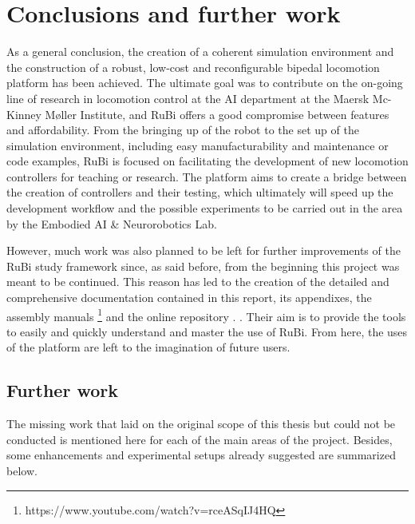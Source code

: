 \chapter{Conclusions and further work} %
\label{cha:conclusions}
As a general conclusion, the creation of a coherent simulation environment and the construction of a robust, low-cost and reconfigurable bipedal locomotion platform has been achieved.
The ultimate goal was to contribute on the on-going line of research in locomotion control at the AI department at the Maersk Mc-Kinney Møller Institute, and RuBi offers a good compromise between features and affordability.
From the bringing up of the robot to the set up of the simulation environment,  including easy manufacturability and maintenance or code examples, RuBi is focused on facilitating the development of new locomotion controllers for teaching or research.
The platform aims to create a bridge between the creation of controllers and their testing, which ultimately will speed up the development workflow and the possible experiments to be carried out in the area by the Embodied AI \& Neurorobotics Lab.

However, much work was also planned to be left for further improvements of the RuBi study framework since, as said before, from the beginning this project was meant to be continued.
This reason has led to the creation of the detailed and comprehensive documentation contained in this report, its appendixes, the assembly manuals \footnote{https://www.youtube.com/watch?v=rceASqIJ4HQ} and the online repository \cite{rubi_repo}.
.
Their aim is to provide the tools to easily and quickly understand and master the use of RuBi.
From here, the uses of the platform are left to the imagination of future users.

\section{Further work} %
\label{sec:further_work}
The missing work that laid on the original scope of this thesis but could not be conducted is mentioned here for each of the main areas of the project.
Besides, some enhancements and experimental setups already suggested are summarized below.

